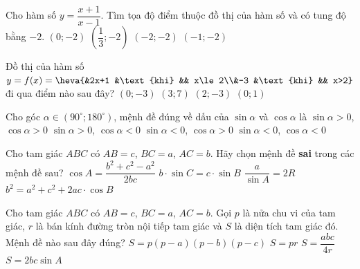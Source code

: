 \begin{ex}%
	Cho hàm số $y=\dfrac{x+1}{x-1}$. Tìm tọa độ điểm thuộc đồ thị của hàm số và có tung độ bằng $-2$.
	\choice
	{$(0;-2)$}
	{\True $\left(\dfrac{1}{3};-2\right)$}
	{$(-2;-2)$}
	{$(-1;-2)$}
\end{ex}
\begin{ex}%
	Đồ thị của hàm số $y=f(x)=\heva{&2x+1 &\text{khi} && x\le 2\\&-3 &\text{khi} && x>2}$ đi qua điểm nào sau đây?
	\choice
	{$(0;-3)$}
	{$(3;7)$}
	{$(2;-3)$}
	{\True $(0;1)$}
\end{ex}
\begin{ex}%
	Cho góc $\alpha \in (90^\circ;180^\circ)$, mệnh đề đúng về dấu của $\sin \alpha$ và $\cos \alpha$ là
	\choice
	{$\sin \alpha>0$, $\cos \alpha>0$}
	{\True $\sin \alpha>0$, $\cos \alpha<0$}
	{$\sin \alpha<0$, $\cos \alpha >0$}
	{$\sin \alpha<0$, $\cos \alpha <0$}
\end{ex}
\begin{ex}%
	Cho tam giác $ABC$ có $AB=c$, $BC=a$, $AC=b$. Hãy chọn mệnh đề \textbf{sai} trong các mệnh đề sau?
	\choice
	{$\cos A=\dfrac{b^2+c^2-a^2}{2bc}$}
	{$b\cdot\sin C=c\cdot\sin B$}
	{$\dfrac{a}{\sin A}=2R$}
	{\True $b^2=a^2+c^2+2ac\cdot\cos B$}
\end{ex}
\begin{ex}%
	
	Cho tam giác $ABC$ có $AB=c$, $BC=a$, $AC=b$. Gọi $p$ là nửa chu vi của tam giác, $r$ là bán kính đường tròn nội tiếp tam giác và $S$ là diện tích tam giác đó. Mệnh đề nào sau đây đúng?
	\choice
	{$S=p(p-a)(p-b)(p-c)$}
	{\True $S=pr$}
	{$S=\dfrac{abc}{4r}$}
	{$S=2bc\sin A$}
\end{ex}
